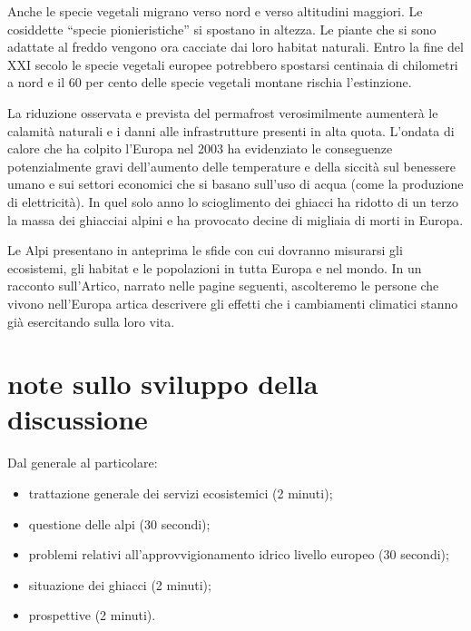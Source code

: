\documentclass[11pt,a4paper]{article}
\begin{document}
	Anche le specie vegetali migrano verso nord e verso altitudini maggiori. Le cosiddette ``specie pionieristiche'' si spostano in altezza. Le piante che si sono adattate al freddo vengono ora cacciate dai loro habitat naturali. Entro la fine del XXI secolo le specie vegetali europee potrebbero spostarsi centinaia di chilometri a nord e il 60 per cento delle specie vegetali montane rischia l'estinzione.
	
	La riduzione osservata e prevista del permafrost verosimilmente aumenterà le calamità naturali e i danni alle infrastrutture presenti in alta quota. L'ondata di calore che ha colpito l'Europa nel 2003 ha evidenziato le conseguenze potenzialmente gravi dell'aumento delle temperature e della siccità sul benessere umano e sui settori economici che si basano sull'uso di acqua (come la produzione di elettricità). In quel solo anno lo scioglimento dei ghiacci ha ridotto di un terzo la massa dei ghiacciai alpini e ha provocato decine di migliaia di morti in Europa.
	
	Le Alpi presentano in anteprima le sfide con cui dovranno misurarsi gli ecosistemi, gli habitat e le popolazioni in tutta Europa e nel mondo. In un racconto sull'Artico, narrato nelle pagine seguenti, ascolteremo le persone che vivono nell'Europa artica descrivere gli effetti che i cambiamenti climatici stanno già esercitando sulla loro vita.
	
	\newpage
	
	
	
	
	\appendix
	\section{note sullo sviluppo della discussione}
	Dal generale al particolare:
	\begin{itemize}
		\item trattazione generale dei servizi ecosistemici (2 minuti);
		\item questione delle alpi (30 secondi);
		\item problemi relativi all'approvvigionamento idrico livello europeo (30 secondi);
		\item situazione dei ghiacci (2 minuti);
		\item prospettive  (2 minuti).
	\end{itemize}
\end{document}
